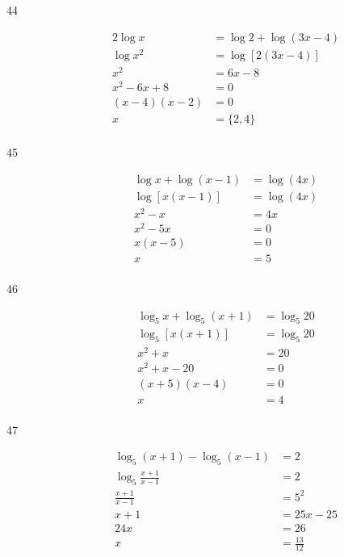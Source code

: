 \documentclass{exam}
\begin{document}
\begin{description}
      \item[44] 
        \begin{align*}
          2 \log x       &= \log 2 + \log(3x - 4) \\
          \log x^2       &= \log [2(3x - 4)] \\
          x^2            &= 6x - 8 \\
          x^2 - 6x + 8   &= 0 \\
          (x - 4)(x - 2) &= 0 \\
          x              &= \boxed{\{2, 4\}} \\
        \end{align*}

      \item[45] 
        \begin{align*}
          \log x + \log(x - 1) &= \log (4x) \\
          \log [x(x - 1)]      &= \log (4x) \\
          x^2 - x              &= 4x \\
          x^2 - 5x             &= 0 \\
          x(x - 5)             &= 0 \\
          x                    &= \boxed{5} \\
        \end{align*}

      \item[46] 
        \begin{align*}
          \log_5 x + \log_5(x + 1) &= \log_5 20 \\
          \log_5 [x(x + 1)]        &= \log_5 20 \\
          x^2 + x                  &= 20 \\
          x^2 + x - 20             &= 0 \\
          (x + 5)(x - 4)           &= 0 \\
          x                        &= \boxed{4} \\
        \end{align*}

      \item[47] 
        \begin{align*}
          \log_5 (x + 1) - \log_5 (x - 1) &= 2 \\
          \log_5 \frac{x + 1}{x - 1}      &= 2 \\
          \frac{x + 1}{x - 1}             &= 5^2 \\
          x + 1                           &= 25x - 25 \\
          24x                             &= 26 \\
          x                               &= \boxed{\frac{13}{12}} \\
        \end{align*}


\end{description}
\end{document}
